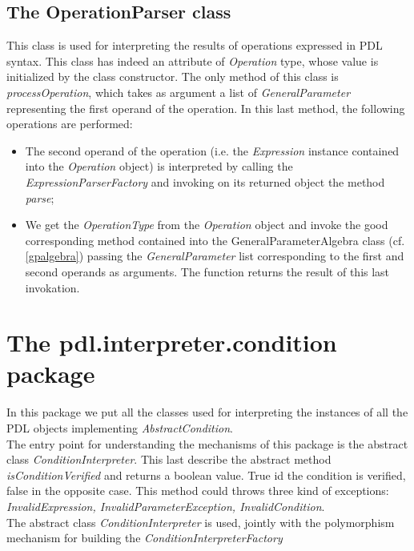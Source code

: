 \documentclass[a4paper,11pt] {ivoa}
\begin{document}
\subsection{The OperationParser class}\label{operationParser}
This class is used for interpreting the results of operations expressed in PDL syntax. 
This class has indeed an attribute of {\it Operation} type, whose value is initialized by the class constructor. The only method of this class is {\it processOperation}, which takes as argument a list of {\it GeneralParameter} representing the first operand of the operation. In this last method, the following operations are performed:
\begin{itemize}
\item The second operand of the operation (i.e. the {\it Expression} instance contained into the {\it Operation} object) is interpreted by calling the {\it ExpressionParserFactory} and invoking on its returned object the method {\it parse};
\item We get the {\it OperationType} from the  {\it Operation} object and invoke the good corresponding method contained into the {GeneralParameterAlgebra} class (cf. \ref{gpalgebra})  passing the {\it GeneralParameter} list corresponding to the first and second operands as arguments. The function returns the result of this last invokation.
\end{itemize}

\section{The pdl.interpreter.condition package}\label{conditionInterpreters}
In this package we put all the classes used for interpreting the instances of all the PDL objects implementing {\it AbstractCondition}.\\
The entry point for understanding the mechanisms of this package is the abstract class {\it ConditionInterpreter}. This last describe the abstract method
{\it isConditionVerified} and returns a boolean value. True id the condition is verified, false in the opposite case. This method could throws three kind of exceptions: {\it InvalidExpression,  InvalidParameterException, InvalidCondition}.\\
The abstract class {\it ConditionInterpreter} is used, jointly with the polymorphism mechanism for building the {\it ConditionInterpreterFactory}
\end{document}
